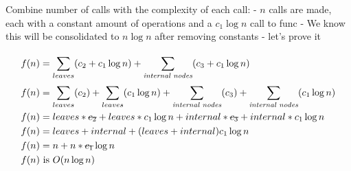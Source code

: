 \documentclass[12pt]{article}
\newcommand{\stkout}[1]{\ifmmode\text{\sout{\ensuremath{#1}}}\else\sout{#1}\fi}
\begin{document}
Combine number of calls with the complexity of each call:\newline
- $n$ calls are made, each with a constant amount of operations and a $c_1\log n$ call to func\newline
- We know this will be consolidated to $n\log n$ after removing constants - let's prove it

\begin{align*}
&f(n)=\sum_{leaves}^{}(c_2+c_1\log n)+\sum_{\textit{internal nodes}}^{}(c_3+c_1\log n)\\ 
&f(n)=\sum_{leaves}^{}(c_2)+\sum_{leaves}^{}(c_1\log n) + \sum_{\textit{internal nodes}}^{} (c_3) + \sum_{\textit{internal nodes}}^{}(c_1\log n)\\
&f(n)=leaves*\stkout{c_2}+leaves*c_1\log n+internal*\stkout{c_3}+internal*c_1\log n\\
&f(n)=leaves+internal+(leaves+internal)c_1\log n\\
&f(n)=n+n*\stkout{c_1}\log n\\
&f(n) \text{ is } O(n\log n)
\end{align*}
\end{document}
